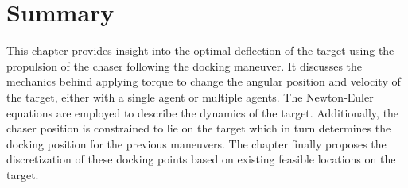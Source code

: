 \section{Summary}
This chapter provides insight into the optimal deflection of the target using the propulsion of the chaser following the docking maneuver.
It discusses the mechanics behind applying torque to change the angular position and velocity of the target, either with a single agent or multiple agents.
The Newton-Euler equations are employed to describe the dynamics of the target.
Additionally, the chaser position is constrained to lie on the target which in turn determines the docking position for the previous maneuvers.
The chapter finally proposes the discretization of these docking points based on existing feasible locations on the target.